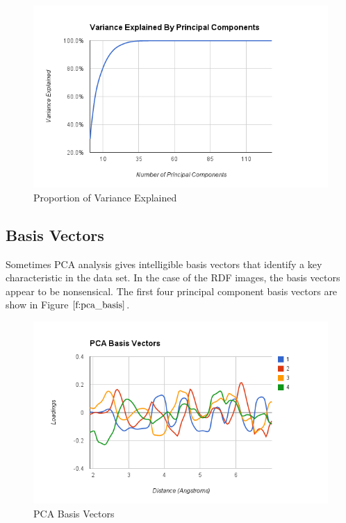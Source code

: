 \documentclass[12pt,letterpaper]{article}
\begin{document}
\begin{figure}[ht]
  \begin{center}
    \includegraphics[scale=0.7]{figs/pca_proportion_variance.png}
    \caption{Proportion of Variance Explained\label{f:pca_dim}}
  \end{center}
\end{figure}

\subsection{Basis Vectors}
Sometimes PCA analysis gives intelligible basis vectors that identify a key
characteristic in the data set. In the case of the RDF images, the basis vectors
appear to be nonsensical. The first four principal component basis vectors are
show in Figure $\ref{f:pca_basis}$.

\begin{figure}[ht]
  \begin{center}
    \includegraphics[scale=0.7]{figs/pca_basis_vectors.png}
    \caption{PCA Basis Vectors\label{f:pca_basis}}
  \end{center}
\end{figure}
\clearpage
\end{document}
